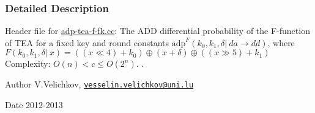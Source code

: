 \subsubsection{\-Detailed \-Description}
\-Header file for \hyperlink{adp-tea-f-fk_8cc}{adp-\/tea-\/f-\/fk.\-cc}\-: \-The \-A\-D\-D differential probability of the \-F-\/function of \-T\-E\-A for a fixed key and round constants $\mathrm{adp}^{F}(k_0, k_1, \delta |~ da \rightarrow dd)$, where $ F(k_0, k_1, \delta |~ x) = ((x \ll 4) + k_0) \oplus (x + \delta) \oplus ((x \gg 5) + k_1)$ \-Complexity\-: $ O(n) < c \le O(2^n) $. . \begin{DoxyAuthor}{\-Author}
\-V.\-Velichkov, \href{mailto:vesselin.velichkov@uni.lu}{\tt vesselin.\-velichkov@uni.\-lu} 
\end{DoxyAuthor}
\begin{DoxyDate}{\-Date}
2012-\/2013 
\end{DoxyDate}


